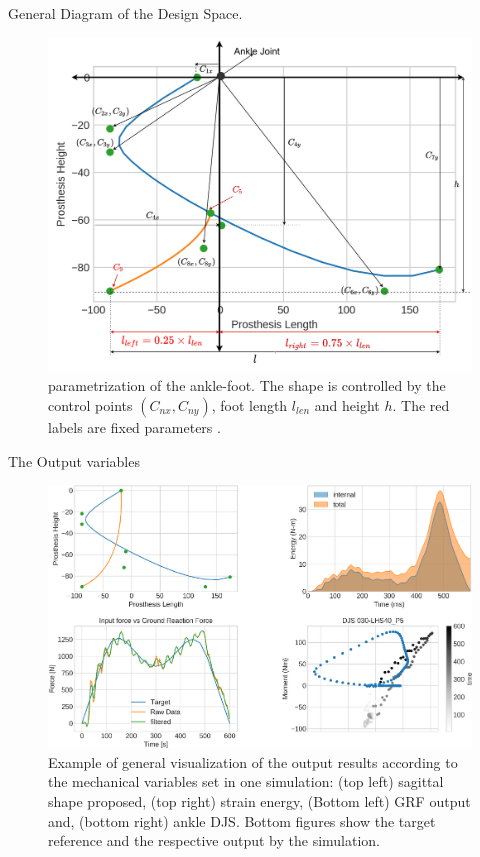 \documentclass[10pt]{beamer}
\begin{document}
\begin{frame}{General Diagram of the Design Space.}
\begin{footnotesize}
\begin{figure}
\centerline{\includegraphics[scale=0.20]{Feathergraphics/ControlPointsDiagram.pdf}}
\caption{parametrization of the ankle-foot. The shape is controlled by the control points $(C_{nx}, C_{ny})$, foot length $l_{len}$ and height $h$. The red labels are fixed parameters \label{fig:shape_variables}.}
\end{figure}
\end{footnotesize}
\end{frame}

\begin{frame}{The Output variables}
\begin{footnotesize}
\begin{figure}
\centerline{\includegraphics[scale=0.6]{Feathergraphics/complete_viz.png}}
\caption{\label{fig:Best-all-together} Example of general visualization of the output results according to the mechanical variables set in one simulation: (top left) sagittal shape proposed, (top right) strain energy, (Bottom left) GRF output and, (bottom right) ankle DJS. Bottom figures show the target reference and the respective output by the simulation.}
\end{figure}
\end{footnotesize}
\end{frame}
\end{document}
